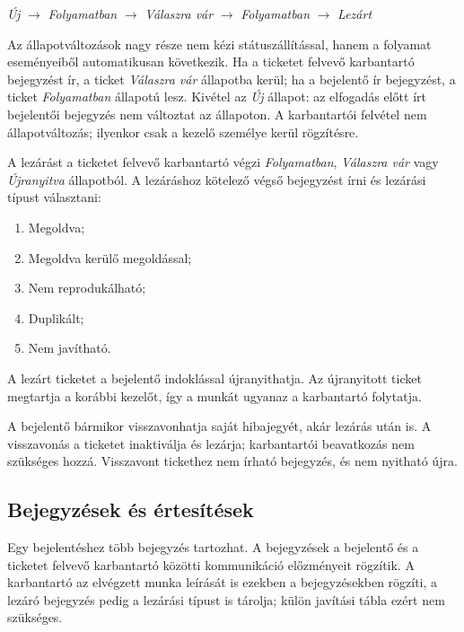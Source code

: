 \documentclass[12pt, a4paper, twoside]{article}
\begin{document}
\begin{center}
\textit{Új}
$\rightarrow$
\textit{Folyamatban}
$\rightarrow$
\textit{Válaszra vár}
$\rightarrow$
\textit{Folyamatban}
$\rightarrow$
\textit{Lezárt}
\end{center}

Az állapotváltozások nagy része nem kézi státuszállítással, hanem a folyamat eseményeiből automatikusan következik. Ha a ticketet felvevő karbantartó bejegyzést ír, a ticket \textit{Válaszra vár} állapotba kerül; ha a bejelentő ír bejegyzést, a ticket \textit{Folyamatban} állapotú lesz. Kivétel az \textit{Új} állapot: az elfogadás előtt írt bejelentői bejegyzés nem változtat az állapoton. A karbantartói felvétel nem állapotváltozás; ilyenkor csak a kezelő személye kerül rögzítésre.

A lezárást a ticketet felvevő karbantartó végzi \textit{Folyamatban}, \textit{Válaszra vár} vagy \textit{Újranyitva} állapotból. A lezáráshoz kötelező végső bejegyzést írni és lezárási típust választani:

\begin{enumerate}
    \item Megoldva;
    \item Megoldva kerülő megoldással;
    \item Nem reprodukálható;
    \item Duplikált;
    \item Nem javítható.
\end{enumerate}

A lezárt ticketet a bejelentő indoklással újranyithatja. Az újranyitott ticket megtartja a korábbi kezelőt, így a munkát ugyanaz a karbantartó folytatja.

A bejelentő bármikor visszavonhatja saját hibajegyét, akár lezárás után is. A visszavonás a ticketet inaktiválja és lezárja; karbantartói beavatkozás nem szükséges hozzá. Visszavont tickethez nem írható bejegyzés, és nem nyitható újra.

\subsection{Bejegyzések és értesítések}

Egy bejelentéshez több bejegyzés tartozhat. A bejegyzések a bejelentő és a ticketet felvevő karbantartó közötti kommunikáció előzményeit rögzítik. A karbantartó az elvégzett munka leírását is ezekben a bejegyzésekben rögzíti, a lezáró bejegyzés pedig a lezárási típust is tárolja; külön javítási tábla ezért nem szükséges.
\end{document}
